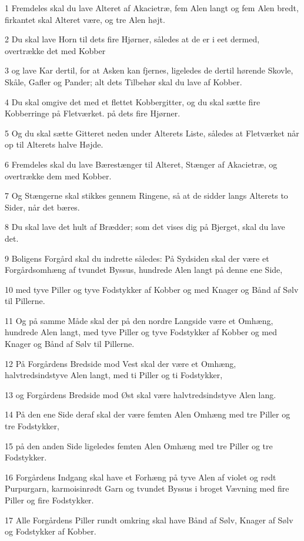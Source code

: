 \par 1 Fremdeles skal du lave Alteret af Akacietræ, fem Alen langt og fem Alen bredt, firkantet skal Alteret være, og tre Alen højt.
\par 2 Du skal lave Horn til dets fire Hjørner, således at de er i eet dermed, overtrække det med Kobber
\par 3 og lave Kar dertil, for at Asken kan fjernes, ligeledes de dertil hørende Skovle, Skåle, Gafler og Pander; alt dets Tilbehør skal du lave af Kobber.
\par 4 Du skal omgive det med et flettet Kobbergitter, og du skal sætte fire Kobberringe på Fletværket. på dets fire Hjørner.
\par 5 Og du skal sætte Gitteret neden under Alterets Liste, således at Fletværket når op til Alterets halve Højde.
\par 6 Fremdeles skal du lave Bærestænger til Alteret, Stænger af Akacietræ, og overtrække dem med Kobber.
\par 7 Og Stængerne skal stikkes gennem Ringene, så at de sidder langs Alterets to Sider, når det bæres.
\par 8 Du skal lave det hult af Brædder; som det vises dig på Bjerget, skal du lave det.
\par 9 Boligens Forgård skal du indrette således: På Sydsiden skal der være et Forgårdsomhæng af tvundet Byssus, hundrede Alen langt på denne ene Side,
\par 10 med tyve Piller og tyve Fodstykker af Kobber og med Knager og Bånd af Sølv til Pillerne.
\par 11 Og på samme Måde skal der på den nordre Langside være et Omhæng, hundrede Alen langt, med tyve Piller og tyve Fodstykker af Kobber og med Knager og Bånd af Sølv til Pillerne.
\par 12 På Forgårdens Bredside mod Vest skal der være et Omhæng, halvtredsindstyve Alen langt, med ti Piller og ti Fodstykker,
\par 13 og Forgårdens Bredside mod Øst skal være halvtredsindstyve Alen lang.
\par 14 På den ene Side deraf skal der være femten Alen Omhæng med tre Piller og tre Fodstykker,
\par 15 på den anden Side ligeledes femten Alen Omhæng med tre Piller og tre Fodstykker.
\par 16 Forgårdens Indgang skal have et Forhæng på tyve Alen af violet og rødt Purpurgarn, karmoisinrødt Garn og tvundet Byssus i broget Vævning med fire Piller og fire Fodstykker.
\par 17 Alle Forgårdens Piller rundt omkring skal have Bånd af Sølv, Knager af Sølv og Fodstykker af Kobber.
